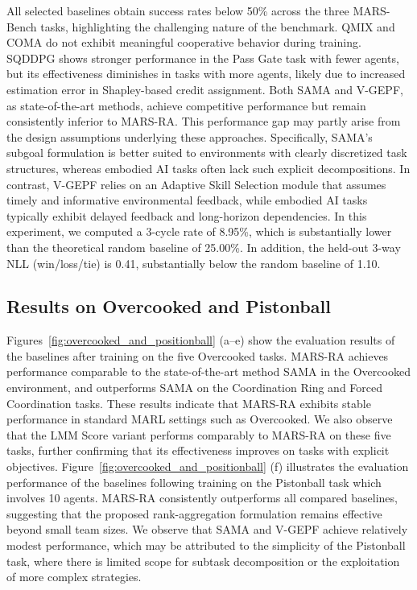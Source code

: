 \documentclass[11pt]{article}
\begin{document}
All selected baselines obtain success rates below 50\% across the three MARS-Bench tasks, highlighting the challenging nature of the benchmark. QMIX and COMA do not exhibit meaningful cooperative behavior during training. SQDDPG shows stronger performance in the Pass Gate task with fewer agents, but its effectiveness diminishes in tasks with more agents, likely due to increased estimation error in Shapley-based credit assignment. Both SAMA and V-GEPF, as state-of-the-art methods, achieve competitive performance but remain consistently inferior to MARS-RA. This performance gap may partly arise from the design assumptions underlying these approaches. Specifically, SAMA’s subgoal formulation is better suited to environments with clearly discretized task structures, whereas embodied AI tasks often lack such explicit decompositions. In contrast, V-GEPF relies on an Adaptive Skill Selection module that assumes timely and informative environmental feedback, while embodied AI tasks typically exhibit delayed feedback and long-horizon dependencies. In this experiment, we computed a 3-cycle rate of 8.95\%, which is substantially lower than the theoretical random baseline of 25.00\%. In addition, the held-out 3-way NLL (win/loss/tie) is 0.41, substantially below the random baseline of 1.10. %

\subsection{Results on Overcooked and Pistonball}
Figures~\ref{fig:overcooked_and_positionball} (a–e) show the evaluation results of the baselines after training on the five Overcooked tasks. MARS-RA achieves performance comparable to the state-of-the-art method SAMA in the Overcooked environment, and outperforms SAMA on the Coordination Ring and Forced Coordination tasks. These results indicate that MARS-RA exhibits stable performance in standard MARL settings such as Overcooked. We also observe that the LMM Score variant performs comparably to MARS-RA on these five tasks, further confirming that its effectiveness improves on tasks with explicit objectives. Figure~\ref{fig:overcooked_and_positionball} (f) illustrates the evaluation performance of the baselines following training on the Pistonball task which involves 10 agents. MARS-RA consistently outperforms all compared baselines, suggesting that the proposed rank-aggregation formulation remains effective beyond small team sizes. We observe that SAMA and V-GEPF achieve relatively modest performance, which may be attributed to the simplicity of the Pistonball task, where there is limited scope for subtask decomposition or the exploitation of more complex strategies.
\end{document}

